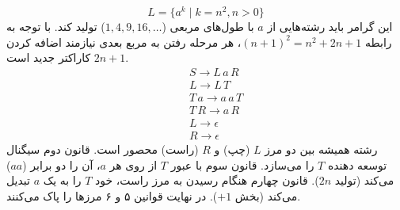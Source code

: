 \[
L = \{a^k \mid k = n^2, n > 0\}
\]
این گرامر باید رشته‌هایی از $a$ با طول‌های مربعی ($1, 4, 9, 16, \dots$) تولید کند. با توجه به رابطه $(n+1)^2 = n^2 + 2n + 1$، هر مرحله رفتن به مربع بعدی نیازمند اضافه کردن $2n+1$ کاراکتر جدید است.
\begin{align*}
     \quad & S \rightarrow L\,a\,R \\
     \quad & L \rightarrow L\,T \\
     \quad & T\,a \rightarrow a\,a\,T \\
     \quad & T\,R \rightarrow a\,R \\
     \quad & L \rightarrow \epsilon \\
     \quad & R \rightarrow \epsilon
\end{align*}
 رشته همیشه بین دو مرز $L$ (چپ) و $R$ (راست) محصور است. قانون دوم سیگنال توسعه دهنده $T$ را می‌سازد. قانون سوم با عبور $T$ از روی هر $a$، آن را دو برابر ($aa$) می‌کند (تولید $2n$). قانون چهارم هنگام رسیدن به مرز راست، خود $T$ را به یک $a$ تبدیل می‌کند (بخش $+1$). در نهایت قوانین ۵ و ۶ مرزها را پاک می‌کنند.
